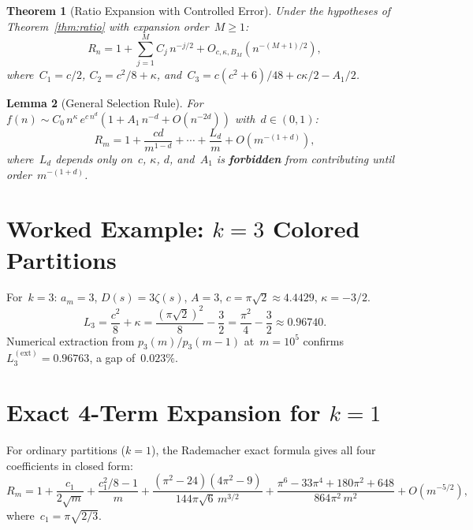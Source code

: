 \documentclass[11pt,a4paper]{article}
\newtheorem{theorem}{Theorem}[section]
\newtheorem{lemma}[theorem]{Lemma}
\begin{document}
\begin{theorem}[Ratio Expansion with Controlled Error]\label{thm:ratio_prime}
Under the hypotheses of Theorem~\ref{thm:ratio} with expansion order~$M \geq 1$:
\begin{equation}\label{eq:ratio_M}
  R_n = 1 + \sum_{j=1}^{M} C_j\,n^{-j/2} + O_{c,\kappa,B_M}\!\left(n^{-(M+1)/2}\right),
\end{equation}
where~$C_1 = c/2$, $C_2 = c^2/8 + \kappa$, and~$C_3 = c(c^2+6)/48 + c\kappa/2 - A_1/2$.
\end{theorem}

\begin{lemma}[General Selection Rule]\label{lem:selection}
For~$f(n) \sim C_0\,n^{\kappa}\,e^{c\,n^d}(1 + A_1\,n^{-d} + O(n^{-2d}))$ with~$d \in (0,1)$:
\[
  R_m = 1 + \frac{cd}{m^{1-d}} + \cdots + \frac{L_d}{m} + O(m^{-(1+d)}),
\]
where~$L_d$ depends only on~$c$, $\kappa$, $d$, and~$A_1$ is \textbf{forbidden} from contributing until order~$m^{-(1+d)}$.
\end{lemma}

\section{Worked Example: \texorpdfstring{$k=3$}{k=3} Colored Partitions}\label{sec:example}

For~$k=3$: $a_m = 3$, $D(s) = 3\zeta(s)$, $A = 3$, $c = \pi\sqrt{2} \approx 4.4429$, $\kappa = -3/2$.
\[
  L_3 = \frac{c^2}{8} + \kappa = \frac{(\pi\sqrt{2})^2}{8} - \frac{3}{2} = \frac{\pi^2}{4} - \frac{3}{2} \approx 0.96740.
\]
Numerical extraction from $p_3(m)/p_3(m-1)$ at~$m = 10^5$ confirms~$L_3^{(\mathrm{ext})} = 0.96763$, a gap of~$0.023\%$.

\section{Exact 4-Term Expansion for \texorpdfstring{$k=1$}{k=1}}\label{sec:exact4}

For ordinary partitions ($k=1$), the Rademacher exact formula gives all four coefficients in closed form:
\begin{equation}\label{eq:4term}
  R_m = 1 + \frac{c_1}{2\sqrt{m}} + \frac{c_1^2/8 - 1}{m}
  + \frac{(\pi^2-24)(4\pi^2-9)}{144\pi\sqrt{6}\,m^{3/2}}
  + \frac{\pi^6 - 33\pi^4 + 180\pi^2 + 648}{864\pi^2\,m^2}
  + O(m^{-5/2}),
\end{equation}
where~$c_1 = \pi\sqrt{2/3}$.
\end{document}
